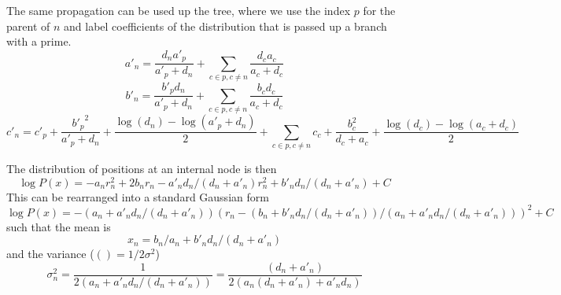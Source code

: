 \documentclass[aps,rmp, onecolumn]{revtex4}
\begin{document}
The same propagation can be used up the tree, where we use the index $p$ for the parent of $n$ and label coefficients of the distribution that is passed up a branch with a prime.
\begin{equation}
    a'_n  =  \frac{d_n a'_p}{a'_p + d_n} + \sum_{c\in p, c\neq n} \frac{d_c a_c}{a_c+d_c}
\end{equation}
\begin{equation}
    b'_n = \frac{b'_p d_n}{a'_p + d_n} + \sum_{c\in p, c\neq n}\frac{b_c d_c}{a_c + d_c}
\end{equation}
\begin{equation}
    c'_n = c'_p + \frac{{b'_p}^2}{a'_p + d_n} + \frac{\log(d_n) - \log(a'_p+d_n)}{2} +  \sum_{c\in p, c\neq n} c_c  + \frac{b_c^2}{d_c + a_c} + \frac{\log(d_c) - \log(a_c+d_c)}{2}
\end{equation}

The distribution of positions at an internal node is then
\begin{equation}
    \log P(x) = -a_n r_n^2 + 2 b_n r_n - a'_n d_n/(d_n + a'_n) r_n^2 + b'_n d_n/(d_n + a'_n) + C
\end{equation}
This can be rearranged into a standard Gaussian form
\begin{equation}
    \log P(x) = -(a_n + a'_n d_n/(d_n + a'_n)) (r_n - (b_n + b'_n d_n/(d_n + a'_n))/(a_n + a'_n d_n/(d_n + a'_n)))^2 + C
\end{equation}
such that the mean is
\begin{equation}
    x_n = b_n/a_n + b'_n d_n/(d_n + a'_n)
\end{equation}
and the variance ($() = 1/2\sigma^2$)
\begin{equation}
    \sigma^2_n = \frac{1}{2(a_n + a'_n d_n/(d_n + a'_n))} = \frac{(d_n + a'_n)}{2(a_n(d_n + a'_n) + a'_n d_n)}
\end{equation}
\end{document}
